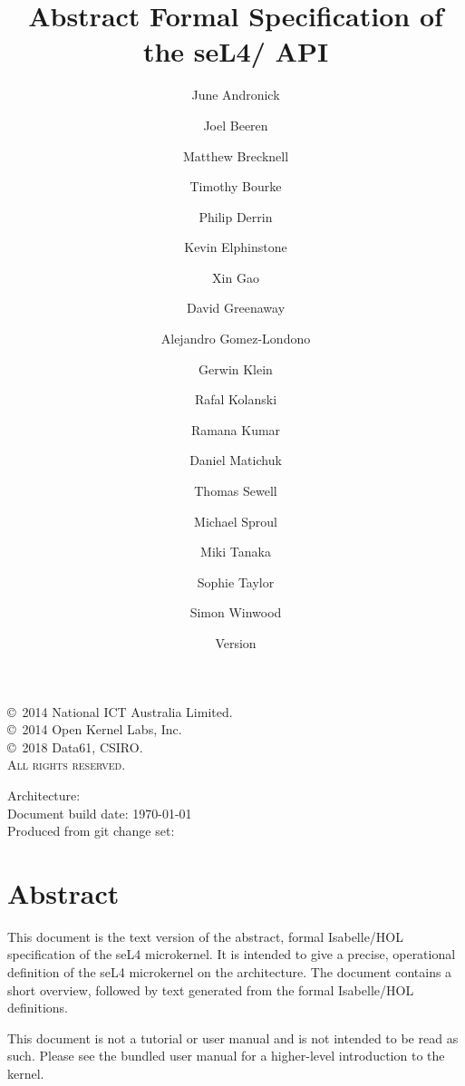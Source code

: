 \documentclass[10pt,a4paper]{scrbook}
\newcommand{\version}{\xspace}
\newcommand{\arch}{\xspace}
\newcommand{\gitrev}{\xspace}
\begin{document}
\title{Abstract Formal Specification of the seL4/\arch API}

\date{Version \version}

\author{%
June Andronick \and
Joel Beeren \and
Matthew Brecknell \and
Timothy Bourke \and
Philip Derrin \and
Kevin Elphinstone \and
Xin Gao \and
David Greenaway \and
Alejandro Gomez-Londono \and
Gerwin Klein \and
Rafal Kolanski \and
Ramana Kumar \and
Daniel Matichuk \and
Thomas Sewell \and
Michael Sproul \and
Miki Tanaka \and
Sophie Taylor \and
Simon Winwood
}

\maketitle

\thispagestyle{empty}

\vfill

\copyright~2014 National ICT Australia Limited.\\
\copyright~2014 Open Kernel Labs, Inc.\\
\copyright~2018 Data61, CSIRO.\\

\textsc{All rights reserved}.

\bigskip

Architecture: \arch\\
Document build date: \today\\
Produced from git change set: \gitrev

\clearpage

\chapter*{Abstract}
This document is the text version of the abstract, formal
Isabelle/HOL specification of the seL4 microkernel. It is
intended to give a precise, operational definition of the
seL4 microkernel on the \arch architecture.
The document contains a short overview, followed by
text generated from the formal Isabelle/HOL definitions.

This document is not a tutorial or user manual and is not intended to be read
as such. Please see the bundled user manual for a higher-level introduction to
the kernel.


\cleardoublepage

\tableofcontents





\end{document}
